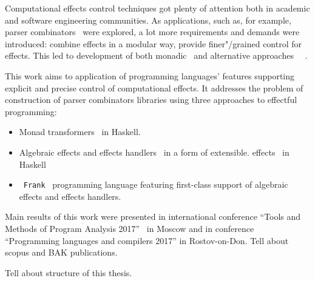 Computational effects control techniques got plenty of attention both in academic and software engineering communities. As applications, such as, for example, parser combinators~\cite{monParsing} were explored, a lot more requirements and demands
were introduced: combine effects in a modular way, provide finer"/grained control
for effects. This led to development of both monadic~\cite{Liang:1995:MTM:199448.199528} and alternative approaches~\cite{Mcbride:2008:APE:1348940.1348941}
~\cite{DBLP:journals/jlp/BauerP15}.

This work aims to application of programming languages' features supporting explicit
and precise control of computational effects. It addresses the problem
of construction of parser combinators libraries using three approaches to
effectful programming:

\begin{itemize}
  \item Monad transformers~\cite{Liang:1995:MTM:199448.199528} in Haskell.
  \item Algebraic effects and effects handlers~\cite{DBLP:journals/jlp/BauerP15}
  in a form of extensible.
  effects~\cite{Kiselyov:2013:EEA:2578854.2503791} in Haskell
  \item~\texttt{Frank}~\cite{DBLP:conf/popl/LindleyMM17} programming language featuring first-class support of algebraic
  effects and effects handlers.
\end{itemize}

Main results of this work were presented in  international conference ``Tools and Methods of Program Analysis 2017''~\cite{tmpa} in Moscow and in conference
``Programming languages and compilers 2017'' in Rostov-on-Don.
Tell about scopus and BAK publications.

Tell about structure of this thesis.

